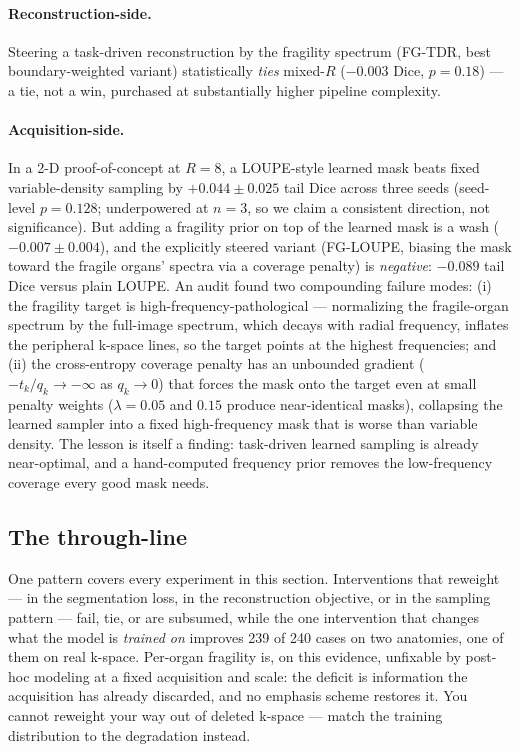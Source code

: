 \documentclass[10pt,twocolumn,letterpaper]{article}
\begin{document}
\paragraph{Reconstruction-side.} Steering a task-driven reconstruction by the fragility spectrum (FG-TDR, best boundary-weighted variant) statistically \emph{ties} mixed-$R$ ($-0.003$ Dice, $p=0.18$) --- a tie, not a win, purchased at substantially higher pipeline complexity.

\paragraph{Acquisition-side.} In a 2-D proof-of-concept at $R=8$, a LOUPE-style learned mask \cite{bahadir2020loupe,huijben2020,bakker2020} beats fixed variable-density sampling by $+0.044\pm0.025$ tail Dice across three seeds (seed-level $p=0.128$; underpowered at $n=3$, so we claim a consistent direction, not significance). But adding a fragility prior on top of the learned mask is a wash ($-0.007\pm0.004$), and the explicitly steered variant (FG-LOUPE, biasing the mask toward the fragile organs' spectra via a coverage penalty) is \emph{negative}: $-0.089$ tail Dice versus plain LOUPE. An audit found two compounding failure modes: (i) the fragility target is high-frequency-pathological --- normalizing the fragile-organ spectrum by the full-image spectrum, which decays with radial frequency, inflates the peripheral k-space lines, so the target points at the highest frequencies; and (ii) the cross-entropy coverage penalty has an unbounded gradient ($-t_k/q_k \to -\infty$ as $q_k\to 0$) that forces the mask onto the target even at small penalty weights ($\lambda=0.05$ and $0.15$ produce near-identical masks), collapsing the learned sampler into a fixed high-frequency mask that is worse than variable density. The lesson is itself a finding: task-driven learned sampling is already near-optimal, and a hand-computed frequency prior removes the low-frequency coverage every good mask needs.

\subsection{The through-line}
\label{sec:throughline}

One pattern covers every experiment in this section. Interventions that reweight --- in the segmentation loss, in the reconstruction objective, or in the sampling pattern --- fail, tie, or are subsumed, while the one intervention that changes what the model is \emph{trained on} improves 239 of 240 cases on two anatomies, one of them on real k-space. Per-organ fragility is, on this evidence, unfixable by post-hoc modeling at a fixed acquisition and scale: the deficit is information the acquisition has already discarded, and no emphasis scheme restores it. You cannot reweight your way out of deleted k-space --- match the training distribution to the degradation instead.
\end{document}
